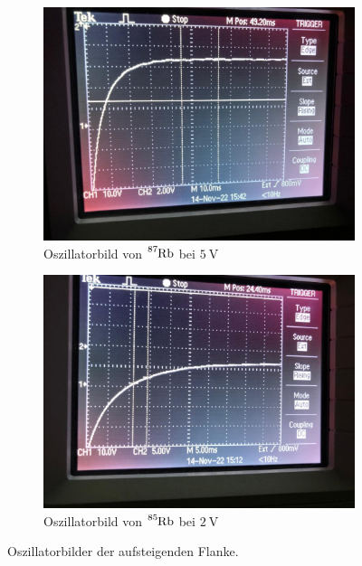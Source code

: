 \begin{figure}
    \centering
    \begin{subfigure}{0.4\textwidth}
        \centering
        \includegraphics[width=\textwidth]{plots/peak1_5V.jpeg}
        \caption{Oszillatorbild von $\ce{^{87}Rb}$ bei $\qty{5}{\volt}$}
        \label{fig:durchschallung}
    \end{subfigure}
    \begin{subfigure}{0.4\textwidth}
        \centering
        \includegraphics[width=\textwidth]{plots/peak2_2V.jpeg}
        \caption{Oszillatorbild von $\ce{^{85}Rb}$ bei $\qty{2}{\volt}$}
        \label{fig:impuls-echo}
    \end{subfigure}
    \caption{Oszillatorbilder der aufsteigenden Flanke.}
    \label{fig:oszi}
\end{figure}
